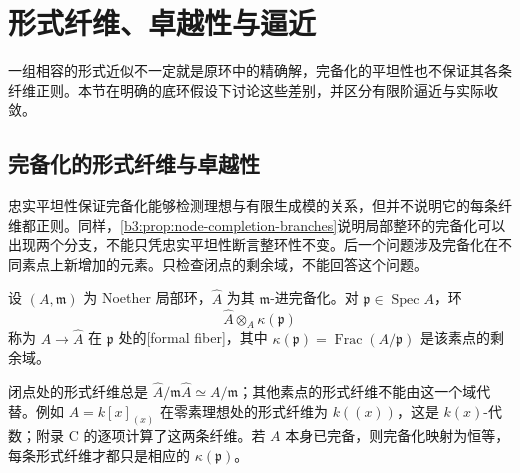 
\section{形式纤维、卓越性与逼近}
\label{b3:sec:D04}

一组相容的形式近似不一定就是原环中的精确解，完备化的平坦性也不保证其各条纤维正则。本节在明确的底环假设下讨论这些差别，并区分有限阶逼近与实际收敛。

%
%
%


\subsection{完备化的形式纤维与卓越性}
\label{b3:subsec:D04:01}

忠实平坦性保证完备化能够检测理想与有限生成模的关系，但并不说明它的每条纤维都正则。同样，\cref{b3:prop:node-completion-branches}说明局部整环的完备化可以出现两个分支，不能只凭忠实平坦性断言整环性不变。后一个问题涉及完备化在不同素点上新增加的元素。只检查闭点的剩余域，不能回答这个问题。

\begin{definition}\label{b3:def:formal-fiber}
	设 \((A,\mathfrak m)\) 为 Noether 局部环，\(\widehat A\) 为其 \(\mathfrak m\)-进完备化。对 \(\mathfrak p\in\operatorname{Spec}A\)，环
	\[
		\widehat A\otimes_A\kappa(\mathfrak p)
	\]
	称为 \(A\to\widehat A\) 在 \(\mathfrak p\) 处的[formal fiber]，其中 \(\kappa(\mathfrak p)=\operatorname{Frac}(A/\mathfrak p)\) 是该素点的剩余域。
\end{definition}

闭点处的形式纤维总是 \(\widehat A/\mathfrak m\widehat A\simeq A/\mathfrak m\)；其他素点的形式纤维不能由这一个域代替。例如 \(A=k[x]_{(x)}\) 在零素理想处的形式纤维为 \(k(\!(x)\!)\)，这是 \(k(x)\)-代数；附录 C 的逐项计算了这两条纤维。若 \(A\) 本身已完备，则完备化映射为恒等，每条形式纤维才都只是相应的 \(\kappa(\mathfrak p)\)。

